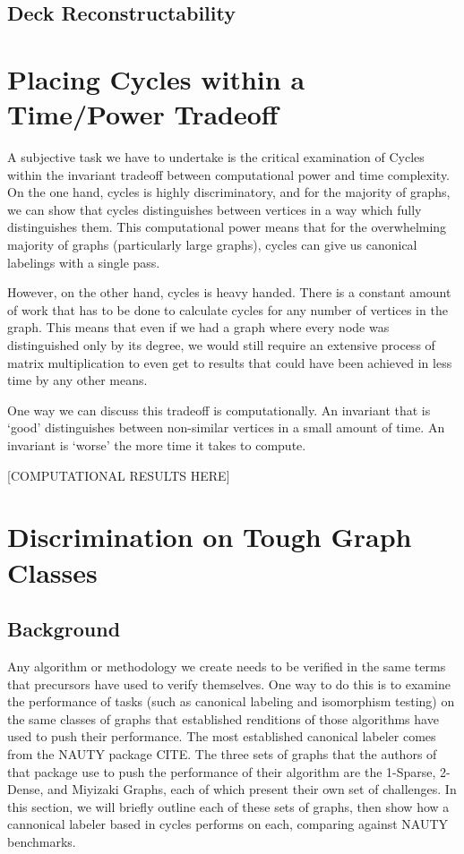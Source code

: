 \documentclass[11pt,a4paper]{report}
\begin{document}
\subsection{Deck Reconstructability}

\section{Placing Cycles within a Time/Power Tradeoff}
A subjective task we have to undertake is the critical examination of Cycles within the invariant tradeoff between computational power and time complexity.
On the one hand, cycles is highly discriminatory, and for the majority of graphs, we can show that cycles distinguishes between vertices in a way which fully distinguishes them.
This computational power means that for the overwhelming majority of graphs (particularly large graphs), cycles can give us canonical labelings with a single pass.

However, on the other hand, cycles is heavy handed. There is a constant amount of work that has to be done to calculate cycles for any number of vertices in the graph. 
This means that even if we had a graph where every node was distinguished only by its degree, we would still require an extensive process of matrix multiplication to even get to results that could have been achieved in less time by any other means.

One way we can discuss this tradeoff is computationally.
An invariant that is `good' distinguishes between non-similar vertices in a small amount of time.
An invariant is `worse' the more time it takes to compute.

[COMPUTATIONAL RESULTS HERE] 


\section{Discrimination  on Tough Graph Classes}
\subsection{Background}
Any algorithm or methodology we create needs to be verified in the same terms that precursors have used to verify themselves.
One way to do this is to examine the performance of tasks (such as canonical labeling and isomorphism testing) on the same classes of graphs that established renditions of those algorithms have used to push their performance.
The most established canonical labeler comes from the NAUTY package CITE.
The three sets of graphs that the authors of that package use to push the performance of their algorithm are the 1-Sparse, 2-Dense, and Miyizaki Graphs, each of which present their own set of challenges.
In this section, we will briefly outline each of these sets of graphs, then show how a cannonical labeler based in cycles performs on each, comparing against NAUTY benchmarks.
\end{document}
